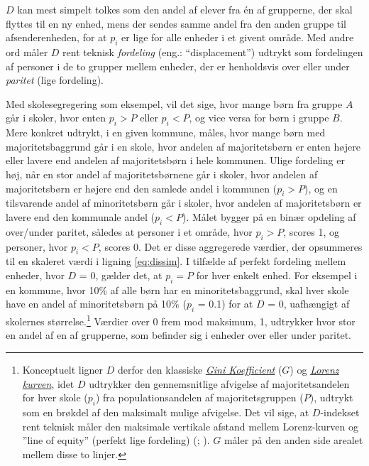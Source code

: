 \documentclass[
]{book}
\begin{document}
\(D\) kan mest simpelt tolkes som den andel af elever fra én af grupperne, der skal flyttes til en ny enhed, mens der sendes samme andel fra den anden gruppe til afsenderenheden, for at \(p_{i}\) er lige for alle enheder i et givent område. Med andre ord måler \(D\) rent teknisk \emph{fordeling} (eng.: ``displacement'') udtrykt som fordelingen af personer i de to grupper mellem enheder, der er henholdsvis over eller under \emph{paritet} (lige fordeling).

Med skolesegregering som eksempel, vil det sige, hvor mange børn fra gruppe \(A\) går i skoler, hvor enten \(p_{i}>P\) eller \(p_{i}<P\), og vice versa for børn i gruppe \(B\). Mere konkret udtrykt, i en given kommune, måles, hvor mange børn med majoritetsbaggrund går i en skole, hvor andelen af majoritetsbørn er enten højere eller lavere end andelen af majoritetsbørn i hele kommunen. Ulige fordeling er høj, når en stor andel af majoritetsbørnene går i skoler, hvor andelen af majoritetsbørn er højere end den samlede andel i kommunen (\(p_{i} > P\)), og en tilsvarende andel af minoritetsbørn går i skoler, hvor andelen af majoritetsbørn er lavere end den kommunale andel (\(p_{i} < P\)). Målet bygger på en binær opdeling af over/under paritet, således at personer i et område, hvor \(p_{i}>P\), scores 1, og personer, hvor \(p_{i}<P\), scores 0. Det er disse aggregerede værdier, der opsummeres til en skaleret værdi i ligning \eqref{eq:dissim}. I tilfælde af perfekt fordeling mellem enheder, hvor \(D\) = 0, gælder det, at \(p_{i}=P\) for hver enkelt enhed. For eksempel i en kommune, hvor 10\% af alle børn har en minoritetsbaggrund, skal hver skole have en andel af minoritetsbørn på 10\% (\(p_{i}\) = 0.1) for at \(D\) = 0, uafhængigt af skolernes størrelse.\footnote{Konceptuelt ligner \(D\) derfor den klassiske \href{https://da.wikipedia.org/wiki/Gini-koefficient}{\emph{Gini Koefficient}} (\(G\)) og \href{https://da.wikipedia.org/wiki/Lorenz-kurve}{\emph{Lorenz kurven}}, idet \(D\) udtrykker den gennemsnitlige afvigelse af majoritetsandelen for hver skole (\(p_{i}\)) fra populationsandelen af majoritetsgruppen (\(P\)), udtrykt som en brøkdel af den maksimalt mulige afvigelse. Det vil sige, at \(D\)-indekset rent teknisk måler den maksimale vertikale afstand mellem Lorenz-kurven og ''line of equity'' (perfekt lige fordeling) (; ). \(G\) måler på den anden side arealet mellem disse to linjer.} Værdier over 0 frem mod maksimum, 1, udtrykker hvor stor en andel af en af grupperne, som befinder sig i enheder over eller under paritet.
\end{document}
